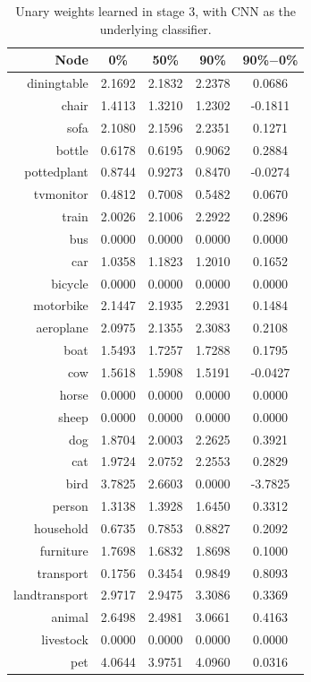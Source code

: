 \documentclass[11pt,a4paper]{book}
\begin{document}
\begin{table}[htbp]
\centering
\begin{tabular}{r|c|c|c|c}
Node & 0\% & 50\% & 90\% & 90\%$-$0\%\\\hline
diningtable   & 2.1692 & 2.1832 & 2.2378 & 0.0686\\
chair         & 1.4113 & 1.3210 & 1.2302 & -0.1811\\
sofa          & 2.1080 & 2.1596 & 2.2351 & 0.1271\\
bottle        & 0.6178 & 0.6195 & 0.9062 & 0.2884\\
pottedplant   & 0.8744 & 0.9273 & 0.8470 & -0.0274\\
tvmonitor     & 0.4812 & 0.7008 & 0.5482 & 0.0670\\
train         & 2.0026 & 2.1006 & 2.2922 & 0.2896\\
bus           & 0.0000 & 0.0000 & 0.0000 & 0.0000\\
car           & 1.0358 & 1.1823 & 1.2010 & 0.1652\\
bicycle       & 0.0000 & 0.0000 & 0.0000 & 0.0000\\
motorbike     & 2.1447 & 2.1935 & 2.2931 & 0.1484\\
aeroplane     & 2.0975 & 2.1355 & 2.3083 & 0.2108\\
boat          & 1.5493 & 1.7257 & 1.7288 & 0.1795\\
cow           & 1.5618 & 1.5908 & 1.5191 & -0.0427\\
horse         & 0.0000 & 0.0000 & 0.0000 & 0.0000\\
sheep         & 0.0000 & 0.0000 & 0.0000 & 0.0000\\
dog           & 1.8704 & 2.0003 & 2.2625 & 0.3921\\
cat           & 1.9724 & 2.0752 & 2.2553 & 0.2829\\
bird          & 3.7825 & 2.6603 & 0.0000 & -3.7825\\
person        & 1.3138 & 1.3928 & 1.6450 & 0.3312\\\hline
household     & 0.6735 & 0.7853 & 0.8827 & 0.2092\\
furniture     & 1.7698 & 1.6832 & 1.8698 & 0.1000\\
transport     & 0.1756 & 0.3454 & 0.9849 & 0.8093\\
landtransport & 2.9717 & 2.9475 & 3.3086 & 0.3369\\
animal        & 2.6498 & 2.4981 & 3.0661 & 0.4163\\
livestock     & 0.0000 & 0.0000 & 0.0000 & 0.0000\\
pet           & 4.0644 & 3.9751 & 4.0960 & 0.0316
\end{tabular}
\caption{Unary weights learned in stage 3, with CNN as the underlying classifier.}
\label{tab:cnnunary}
\end{table}
\end{document}
